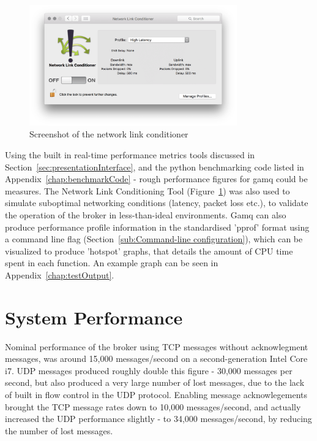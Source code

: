 \begin{figure}[htbp]
  \includegraphics[width=0.8\textwidth]{figures/networkLinkConditioner}
  \centering
  \caption{Screenshot of the network link conditioner}
  \label{fig:linkConditioner}
\end{figure}

Using the built in real-time performance metrics tools discussed in
Section~\ref{sec:presentationInterface}, and the python benchmarking code listed
in Appendix~\ref{chap:benchmarkCode} - rough performance figures for gamq could
be measures. The Network Link Conditioning Tool
(Figure~\ref{fig:linkConditioner}) was also used to simulate suboptimal
networking conditions (latency, packet loss etc.), to validate the operation of
the broker in less-than-ideal environments. Gamq can also produce performance
profile information in the standardised 'pprof' format using a command line flag
(Section~\ref{sub:Command-line configuration}), which can be visualized to
produce 'hotspot' graphs, that details the amount of CPU time spent in each
function. An example graph can be seen in Appendix~\ref{chap:testOutput}.

\section{System Performance}
\label{sec:System Performance}

Nominal performance of the broker using TCP messages without acknowlegment
messages, was around 15,000 messages/second on a second-generation Intel Core
i7. UDP messages produced roughly double this figure - 30,000 messages per
second, but also produced a very large number of lost messages, due to the lack
of built in flow control in the UDP protocol. Enabling message acknowlegements
brought the TCP message rates down to 10,000 messages/second, and actually
increased the UDP performance slightly - to 34,000 messages/second, by reducing
the number of lost messages.
